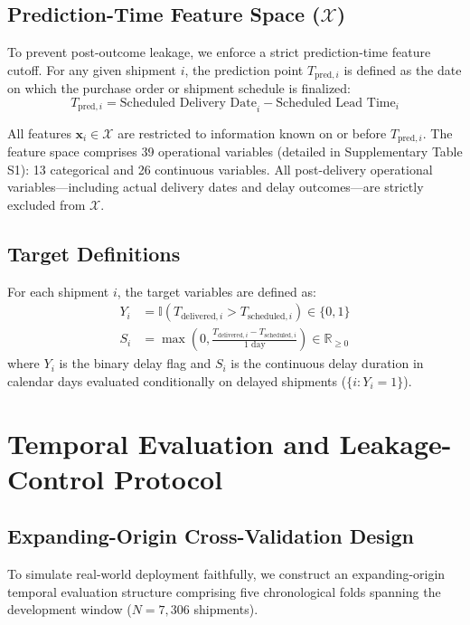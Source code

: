 \documentclass[11pt,a4paper]{article}
\begin{document}
\subsection{Prediction-Time Feature Space ($\mathcal{X}$)}
To prevent post-outcome leakage, we enforce a strict prediction-time feature cutoff. For any given shipment $i$, the prediction point $T_{\text{pred}, i}$ is defined as the date on which the purchase order or shipment schedule is finalized:
\begin{equation}
T_{\text{pred}, i} = \text{Scheduled Delivery Date}_i - \text{Scheduled Lead Time}_i
\end{equation}

All features $\mathbf{x}_i \in \mathcal{X}$ are restricted to information known on or before $T_{\text{pred}, i}$. The feature space comprises 39 operational variables (detailed in Supplementary Table S1): 13 categorical and 26 continuous variables. All post-delivery operational variables---including actual delivery dates and delay outcomes---are strictly excluded from $\mathcal{X}$.

\subsection{Target Definitions}
For each shipment $i$, the target variables are defined as:
\begin{align}
Y_i &= \mathbb{I}\left(T_{\text{delivered}, i} > T_{\text{scheduled}, i}\right) \in \{0, 1\} \\
S_i &= \max\left(0, \frac{T_{\text{delivered}, i} - T_{\text{scheduled}, i}}{1\text{ day}}\right) \in \mathbb{R}_{\ge 0}
\end{align}
where $Y_i$ is the binary delay flag and $S_i$ is the continuous delay duration in calendar days evaluated conditionally on delayed shipments ($\{i : Y_i = 1\}$).

\section{Temporal Evaluation and Leakage-Control Protocol}
\subsection{Expanding-Origin Cross-Validation Design}
To simulate real-world deployment faithfully, we construct an expanding-origin temporal evaluation structure comprising five chronological folds spanning the development window ($N = 7,306$ shipments).
\end{document}

